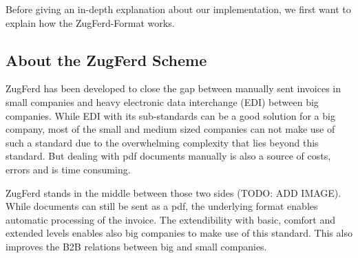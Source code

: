 Before giving an in-depth explanation about our implementation, we first want to explain how the ZugFerd-Format works.

\subsection{About the ZugFerd Scheme}

ZugFerd has been developed to close the gap between manually sent invoices in small companies and heavy electronic data interchange (EDI) between big companies. While EDI with its sub-standards can be a good solution for a big company, most of the small and medium sized companies can not make use of such a standard due to the overwhelming complexity that lies beyond this standard. But dealing with pdf documents manually is also a source of costs, errors and is time consuming.

ZugFerd stands in the middle between those two sides (TODO: ADD IMAGE). While documents can still be sent as a pdf, the underlying format enables automatic processing of the invoice. The extendibility with basic, comfort and extended levels enables also big companies to make use of this standard. This also improves the B2B relations between big and small companies.

